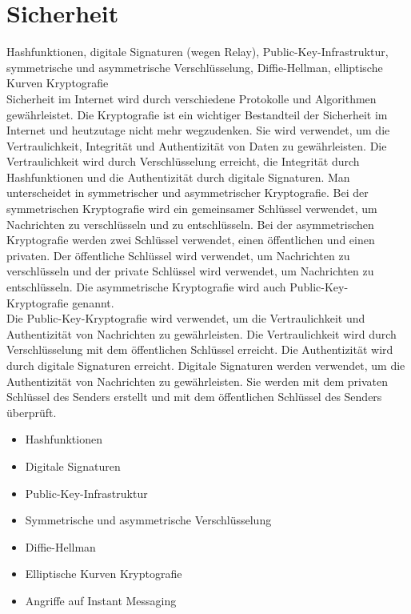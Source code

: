 \section{Sicherheit}
\label{sec:sicherheit_im}

Hashfunktionen, digitale Signaturen (wegen Relay), Public-Key-Infrastruktur, symmetrische und asymmetrische Verschlüsselung, Diffie-Hellman, elliptische Kurven Kryptografie \\

\noindent Sicherheit im Internet wird durch verschiedene Protokolle und Algorithmen gewährleistet. Die Kryptografie ist ein wichtiger Bestandteil der Sicherheit im Internet und heutzutage nicht mehr wegzudenken. Sie wird verwendet, um die Vertraulichkeit, Integrität und Authentizität von Daten zu gewährleisten. Die Vertraulichkeit wird durch Verschlüsselung erreicht, die Integrität durch Hashfunktionen und die Authentizität durch digitale Signaturen. Man unterscheidet in symmetrischer und asymmetrischer Kryptografie. Bei der symmetrischen Kryptografie wird ein gemeinsamer Schlüssel verwendet, um Nachrichten zu verschlüsseln und zu entschlüsseln. Bei der asymmetrischen Kryptografie werden zwei Schlüssel verwendet, einen öffentlichen und einen privaten. Der öffentliche Schlüssel wird verwendet, um Nachrichten zu verschlüsseln und der private Schlüssel wird verwendet, um Nachrichten zu entschlüsseln. Die asymmetrische Kryptografie wird auch Public-Key-Kryptografie genannt. \\

\noindent Die Public-Key-Kryptografie wird verwendet, um die Vertraulichkeit und Authentizität von Nachrichten zu gewährleisten. Die Vertraulichkeit wird durch Verschlüsselung mit dem öffentlichen Schlüssel erreicht. Die Authentizität wird durch digitale Signaturen erreicht. Digitale Signaturen werden verwendet, um die Authentizität von Nachrichten zu gewährleisten. Sie werden mit dem privaten Schlüssel des Senders erstellt und mit dem öffentlichen Schlüssel des Senders überprüft. \\

\begin{itemize}
    \item Hashfunktionen
    \item Digitale Signaturen
    \item Public-Key-Infrastruktur
    \item Symmetrische und asymmetrische Verschlüsselung
    \item Diffie-Hellman
    \item Elliptische Kurven Kryptografie
    \item Angriffe auf Instant Messaging
\end{itemize}